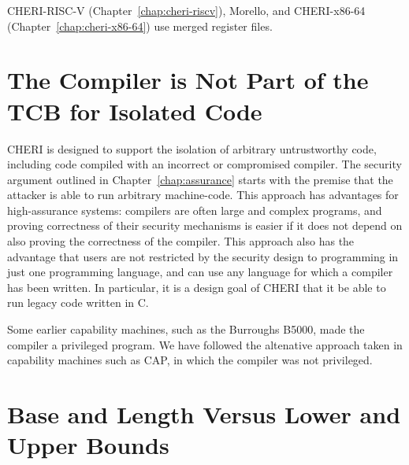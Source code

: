CHERI-RISC-V (Chapter~\ref{chap:cheri-riscv}),
Morello, and CHERI-x86-64 (Chapter~\ref{chap:cheri-x86-64}) use merged register files.

\section{The Compiler is Not Part of the TCB for Isolated Code}

CHERI is designed to support the isolation of arbitrary untrustworthy code,
including code compiled with an incorrect or compromised compiler.
The security argument outlined in
Chapter~\ref{chap:assurance} starts with the premise that the attacker is able to
run arbitrary machine-code. This approach has advantages for high-assurance systems:
compilers are often large and complex programs, and proving correctness of their
security mechanisms is easier if it does not depend on also proving the correctness
of the compiler. This approach also has the advantage that users are not restricted
by the security design to programming in just one programming language, and can use
any language for which a compiler has been written. In particular, it is a design
goal of CHERI that it be able to run legacy code written in C.

Some earlier capability machines, such as the Burroughs B5000, made the compiler
a privileged program. We have followed the altenative approach taken in capability machines
such as CAP, in which the compiler was not privileged.


\section{Base and Length Versus Lower and Upper Bounds}

